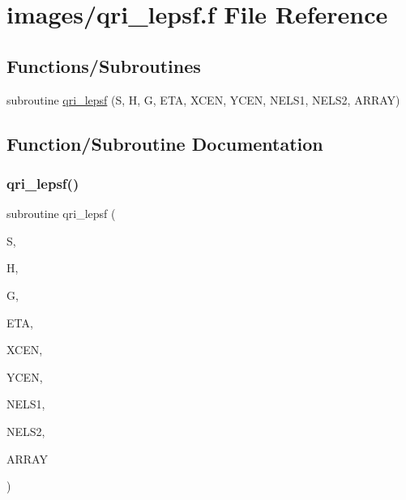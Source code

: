 \hypertarget{qri__lepsf_8f}{}\section{images/qri\+\_\+lepsf.f File Reference}
\label{qri__lepsf_8f}
\subsection*{Functions/\+Subroutines}
\begin{DoxyCompactItemize}
\item 
subroutine \hyperlink{qri__lepsf_8f_a694782932f7993c3a8433c541c7681f9}{qri\+\_\+lepsf} (S, H, G, E\+TA, X\+C\+EN, Y\+C\+EN, N\+E\+L\+S1, N\+E\+L\+S2, A\+R\+R\+AY)
\end{DoxyCompactItemize}


\subsection{Function/\+Subroutine Documentation}
\mbox{\label{qri__lepsf_8f_a694782932f7993c3a8433c541c7681f9}} 
\subsubsection{\texorpdfstring{qri\+\_\+lepsf()}{qri\_lepsf()}}
{\footnotesize\ttfamily subroutine qri\+\_\+lepsf (\begin{DoxyParamCaption}\item[{double precision}]{S,  }\item[{double precision}]{H,  }\item[{double precision}]{G,  }\item[{double precision}]{E\+TA,  }\item[{double precision}]{X\+C\+EN,  }\item[{double precision}]{Y\+C\+EN,  }\item[{integer}]{N\+E\+L\+S1,  }\item[{integer}]{N\+E\+L\+S2,  }\item[{double precision, dimension(nels1,nels2)}]{A\+R\+R\+AY }\end{DoxyParamCaption})}

